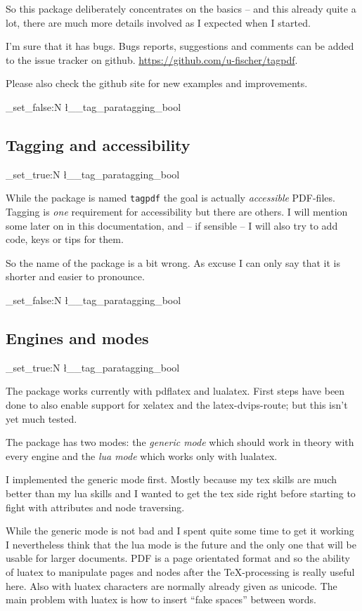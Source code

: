 \documentclass[DIV=12,parskip=half-,bibliography=totoc]{scrartcl}
\newcommand\PDF{PDF}
\newcommand\parataggingON {\bool_set_true:N \l__tag_paratagging_bool}
\newcommand\parataggingOff{\bool_set_false:N \l__tag_paratagging_bool}
\begin{document}
So this package deliberately concentrates on the basics -- and this already quite a lot, there are much more details involved as I expected when I started.

I'm sure that it has bugs. Bugs reports, suggestions and comments can be added to the issue tracker on github. \url{https://github.com/u-fischer/tagpdf}.

Please also check the github site for new examples and improvements.

\parataggingOff

\subsection{Tagging and accessibility}

\parataggingON

While the package is named \texttt{tagpdf} the goal is actually \emph{accessible} \PDF{}-files. Tagging is \emph{one} requirement for accessibility but there are others. I will mention some later on in this documentation, and -- if sensible -- I will also try to add code, keys or tips for them.

So the name of the package is a bit wrong. As excuse I can only say that it is shorter and easier to pronounce.

\parataggingOff


\subsection{Engines and modes}

\parataggingON

The package works currently with pdflatex and lualatex. First steps have been done to also enable support for xelatex and the latex-dvips-route; but this isn't yet much tested.

The package has two modes: the \emph{generic mode} which should work in theory with every engine and the \emph{lua mode} which works only with lualatex.


I implemented the generic mode first. Mostly because my tex skills are much better than my lua skills and I wanted to get the tex side right before starting to fight with attributes and node traversing.

While the generic mode is not bad and I spent quite some time to get it working I nevertheless think that the lua mode is the future and the only one that will be usable for larger documents. \PDF{} is a page orientated format and so the ability of luatex to manipulate pages and nodes after the \TeX-processing is really useful here. Also with luatex characters are normally already given as unicode. The main problem with luatex is how to insert \enquote{fake spaces} between words.%
\end{document}
